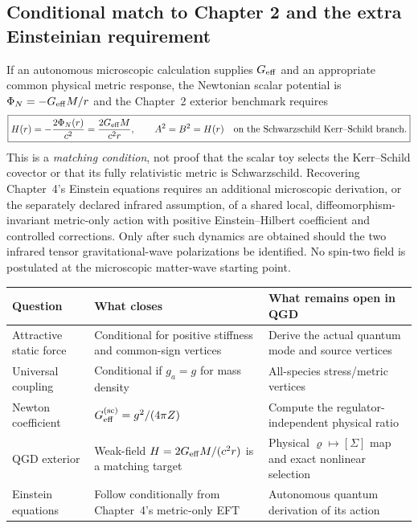 \documentclass[11pt,a4paper]{article}
\theoremstyle{remark}\newtheorem{remark}[theorem]{Remark}
\begin{document}
\subsection{Conditional match to Chapter 2 and the extra Einsteinian requirement}
If an autonomous microscopic calculation supplies $G_{\rm eff}$ and an appropriate common physical metric response, the Newtonian scalar potential is $\Phi_N=-G_{\rm eff}M/r$ and the Chapter~2 exterior benchmark requires
\begin{equation}\label{eq:v22-H}
 \boxed{H(r)=-\frac{2\Phi_N(r)}{c^2}=\frac{2G_{\rm eff}M}{c^2r},\qquad
 A^2=B^2=H(r)\quad\text{on the Schwarzschild Kerr--Schild branch}.}
\end{equation}
This is a \emph{matching condition}, not proof that the scalar toy selects the Kerr--Schild covector or that its fully relativistic metric is Schwarzschild. Recovering Chapter~4's Einstein equations requires an additional microscopic derivation, or the separately declared infrared assumption, of a shared local, diffeomorphism-invariant metric-only action with positive Einstein--Hilbert coefficient and controlled corrections. Only after such dynamics are obtained should the two infrared tensor gravitational-wave polarizations be identified. No spin-two field is postulated at the microscopic matter-wave starting point.

\begin{center}\small
\begin{tabularx}{\linewidth}{@{}p{41mm}p{26mm}X@{}}\toprule
\textbf{Question}&\textbf{What closes}&\textbf{What remains open in QGD}\\\midrule
Attractive static force & Conditional for positive stiffness and common-sign vertices & Derive the actual quantum mode and source vertices \\
Universal coupling & Conditional if $g_a=g$ for mass density & All-species stress/metric vertices \\
Newton coefficient & $G_{\rm eff}^{\rm(sc)}=g^2/(4\pi Z)$ & Compute the regulator-independent physical ratio \\
QGD exterior & Weak-field $H=2G_{\rm eff}M/(c^2r)$ is a matching target & Physical $\varrho\mapsto[\Sigma]$ map and exact nonlinear selection \\
Einstein equations & Follow conditionally from Chapter~4's metric-only EFT & Autonomous quantum derivation of its action \\\bottomrule
\end{tabularx}
\end{center}
\end{document}
